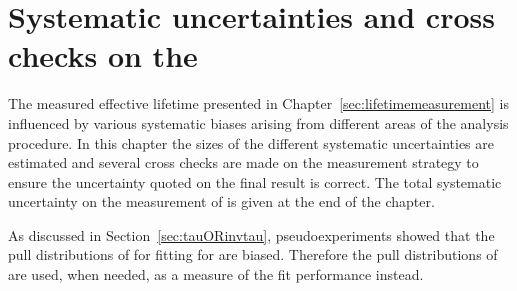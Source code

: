 \chapter{{\bf Systematic uncertainties and cross checks on the \el}}
\label{sec:systematics}
The measured \bsmumu effective lifetime presented in Chapter~\ref{sec:lifetimemeasurement} is influenced by various systematic biases arising from different areas of the analysis procedure. In this chapter the sizes of the different systematic uncertainties are estimated and several cross checks are made on the measurement strategy to ensure the uncertainty quoted on the final result is correct. The total systematic uncertainty on the measurement of \tmumu is given at the end of the chapter.

As discussed in Section~\ref{sec:tauORinvtau}, pseudoexperiments showed that the pull distributions of for fitting for \tmumu are biased. Therefore the pull distributions of \Gmumu are used, when needed, as a measure of the fit performance instead.

